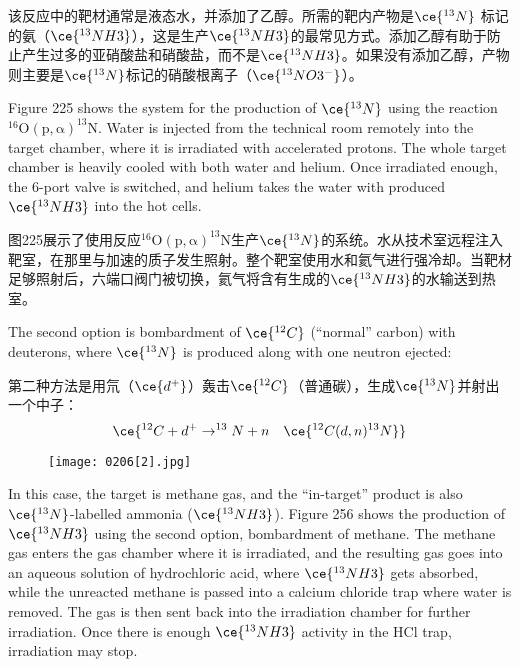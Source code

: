 \documentclass[dvipsnames, svgnames,a4paper,11pt]{article}
\begin{document}
该反应中的靶材通常是液态水，并添加了乙醇。所需的靶内产物是\(\ce{^{13}N}\) 标记的氨（\(\ce{^{13}NH3}\)），这是生产\(\ce{^{13}NH3}\)的最常见方式。添加乙醇有助于防止产生过多的亚硝酸盐和硝酸盐，而不是\(\ce{^{13}NH3}\)。如果没有添加乙醇，产物则主要是\(\ce{^{13}N}\)标记的硝酸根离子（\(\ce{^{13}NO3^-}\)）。


Figure 225 shows the system for the production of \(\ce{^{13}N}\) using the reaction \(\mathrm{^{16}O(p,\alpha)^{13}N}\). Water is injected from the technical room remotely into the target chamber, where it is irradiated with accelerated protons. The whole target chamber is heavily cooled with both water and helium. Once irradiated enough, the 6-port valve is switched, and helium takes the water with produced \(\ce{^{13}NH3}\) into the hot cells.

图225展示了使用反应\(\mathrm{^{16}O(p, \alpha)^{13}N}\)生产\(\ce{^{13}N}\)的系统。水从技术室远程注入靶室，在那里与加速的质子发生照射。整个靶室使用水和氦气进行强冷却。当靶材足够照射后，六端口阀门被切换，氦气将含有生成的\(\ce{^{13}NH3}\)的水输送到热室。



The second option is bombardment of \(\ce{^{12}C}\) (“normal” carbon) with deuterons, where \(\ce{^{13}N}\) is produced along with one neutron ejected:

第二种方法是用氘（\(\ce{d^+}\)）轰击\(\ce{^{12}C}\)（普通碳），生成\(\ce{^{13}N}\)并射出一个中子：
\[
\ce{^{12}C + d^+ \rightarrow ^{13}N + n \quad \ce{^{12}C(d,n)^{13}N}}
\]

\begin{figure}[h]
	\centering
    \texttt{[image: 0206[2].jpg]}  
     \label{fig256}
\end{figure}

In this case, the target is methane gas, and the “in-target” product is also \(\ce{^{13}N}\)-labelled ammonia (\(\ce{^{13}NH3}\)). Figure 256 shows the production of \(\ce{^{13}NH3}\) using the second option, bombardment of methane. The methane gas enters the gas chamber where it is irradiated, and the resulting gas goes into an aqueous solution of hydrochloric acid, where \(\ce{^{13}NH3}\) gets absorbed, while the unreacted methane is passed into a calcium chloride trap where water is removed. The gas is then sent back into the irradiation chamber for further irradiation. Once there is enough \(\ce{^{13}NH3}\) activity in the HCl trap, irradiation may stop.  
\end{document}
